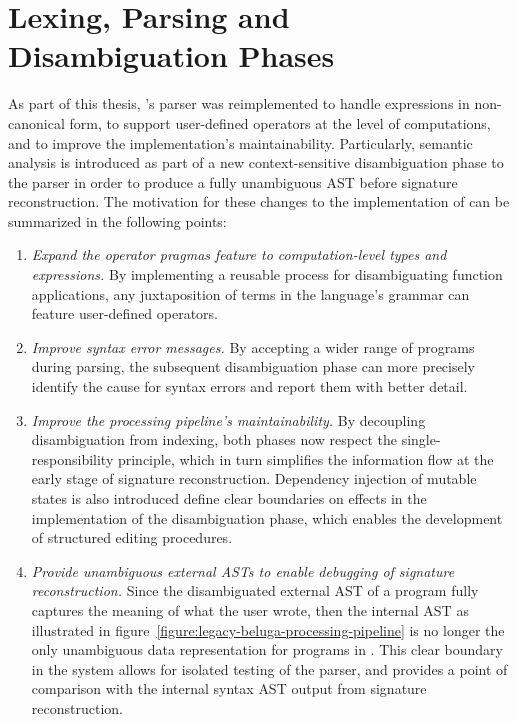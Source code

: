 \clearpage

\section{\Beluga Lexing, Parsing and Disambiguation Phases}\label{section:lexing-parsing-disambiguation}

As part of this thesis, \Beluga's parser was reimplemented to handle expressions in non-canonical form, to support user-defined operators at the level of computations, and to improve the implementation's maintainability.
Particularly, semantic analysis is introduced as part of a new context-sensitive disambiguation phase to the parser in order to produce a fully unambiguous \ac{AST} before signature reconstruction.
The motivation for these changes to the implementation of \Beluga can be summarized in the following points:
\begin{enumerate}
\item
\textit{Expand the operator pragmas feature to computation-level types and expressions.}
By implementing a reusable process for disambiguating function applications, any juxtaposition of terms in the language's grammar can feature user-defined operators.
\item
\textit{Improve syntax error messages.}
By accepting a wider range of programs during parsing, the subsequent disambiguation phase can more precisely identify the cause for syntax errors and report them with better detail.
\item
\textit{Improve the processing pipeline's maintainability.}
By decoupling disambiguation from indexing, both phases now respect the single-responsibility principle, which in turn simplifies the information flow at the early stage of signature reconstruction.
Dependency injection of mutable states is also introduced define clear boundaries on effects in the implementation of the disambiguation phase, which enables the development of structured editing procedures.
\item
\textit{Provide unambiguous external \acp{AST} to enable debugging of signature reconstruction.}
Since the disambiguated external \ac{AST} of a program fully captures the meaning of what the user wrote, then the internal \ac{AST} as illustrated in figure~\ref{figure:legacy-beluga-processing-pipeline} is no longer the only unambiguous data representation for programs in \Beluga.
This clear boundary in the system allows for isolated testing of the parser, and provides a point of comparison with the internal syntax \ac{AST} output from signature reconstruction.
\end{enumerate}


